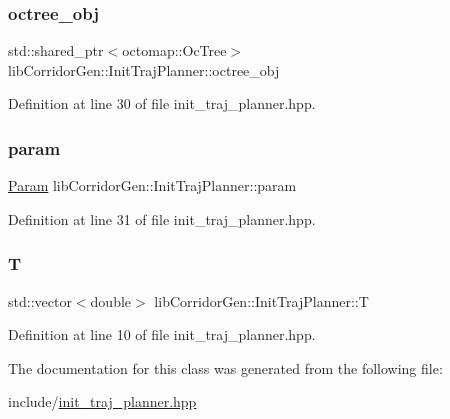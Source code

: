 \subsubsection{\texorpdfstring{octree\+\_\+obj}{octree\_obj}}
{\footnotesize\ttfamily std\+::shared\+\_\+ptr$<$octomap\+::\+Oc\+Tree$>$ lib\+Corridor\+Gen\+::\+Init\+Traj\+Planner\+::octree\+\_\+obj\hspace{0.3cm}{\ttfamily [protected]}}



Definition at line 30 of file init\+\_\+traj\+\_\+planner.\+hpp.

\mbox{\label{classlib_corridor_gen_1_1_init_traj_planner_a2c750ddb7bf244207d43661bda42e1fc}} 
\subsubsection{\texorpdfstring{param}{param}}
{\footnotesize\ttfamily \hyperlink{classlib_corridor_gen_1_1_param}{Param} lib\+Corridor\+Gen\+::\+Init\+Traj\+Planner\+::param\hspace{0.3cm}{\ttfamily [protected]}}



Definition at line 31 of file init\+\_\+traj\+\_\+planner.\+hpp.

\mbox{\label{classlib_corridor_gen_1_1_init_traj_planner_a245efac6cad8f5cac6a09c99dcaf8cbd}} 
\subsubsection{\texorpdfstring{T}{T}}
{\footnotesize\ttfamily std\+::vector$<$double$>$ lib\+Corridor\+Gen\+::\+Init\+Traj\+Planner\+::T}



Definition at line 10 of file init\+\_\+traj\+\_\+planner.\+hpp.



The documentation for this class was generated from the following file\+:\begin{DoxyCompactItemize}
\item 
include/\hyperlink{init__traj__planner_8hpp}{init\+\_\+traj\+\_\+planner.\+hpp}\end{DoxyCompactItemize}
